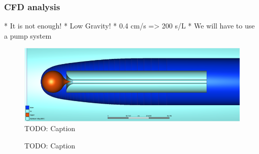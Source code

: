 \subsubsection{CFD analysis}

* It is not enough!
	* Low Gravity!
	* 0.4 cm/s => 200 s/L
	* We will have to use a pump system

\begin{figure}[htb]
	\centering
	\includegraphics[width=\textwidth]{figures/convection/simplified_3d_model}
	\caption{TODO: Caption}
	\label{fig:simplified_3d_model}
\end{figure}

\begin{figure}[htb]
	\centering
	\caption{TODO: Caption}
	\label{fig:cfd}
\end{figure}
